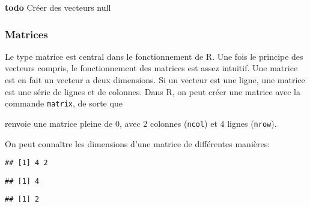 \textbf{todo} Créer des vecteurs null

\subsubsection{Matrices}

Le type matrice est central dans le fonctionnement de R.
Une fois le principe des vecteurs compris, le fonctionnement des matrices est assez intuitif.
Une matrice est en fait un vecteur a deux dimensions.
Si un vecteur est une ligne, une matrice est une série de lignes et de colonnes.
Dans R, on peut créer une matrice avec la commande \texttt{matrix}, de sorte que

\begin{knitrout}
\color{fgcolor}\begin{kframe}
\begin{flushleft}
\ttfamily\noindent
{}\hlassignement{\usebox{\hlnormalsizeboxlessthan}-}{\ }\hlkeyword{(}\hlkeyword{,}{\ }\hlargument{=}{\ }\hlkeyword{,}{\ }\hlargument{=}{\ }\hlkeyword{)}\mbox{}
\normalfont
\end{flushleft}
\end{kframe}
\end{knitrout}


\noindent renvoie une matrice pleine de 0, avec 2 colonnes (\texttt{ncol}) et 4 lignes (\texttt{nrow}).

On peut connaître les dimensions d'une matrice de différentes manières:
\begin{knitrout}
\color{fgcolor}\begin{kframe}
\begin{flushleft}
\ttfamily\noindent
{}\hlkeyword{(}\hlkeyword{)}\mbox{}
\normalfont
\end{flushleft}
\begin{verbatim}
## [1] 4 2
\end{verbatim}
\begin{flushleft}
\ttfamily\noindent
{}\hlkeyword{(}\hlkeyword{)}\mbox{}
\normalfont
\end{flushleft}
\begin{verbatim}
## [1] 4
\end{verbatim}
\begin{flushleft}
\ttfamily\noindent
{}\hlkeyword{(}\hlkeyword{)}\mbox{}
\normalfont
\end{flushleft}
\begin{verbatim}
## [1] 2
\end{verbatim}
\end{kframe}
\end{knitrout}


